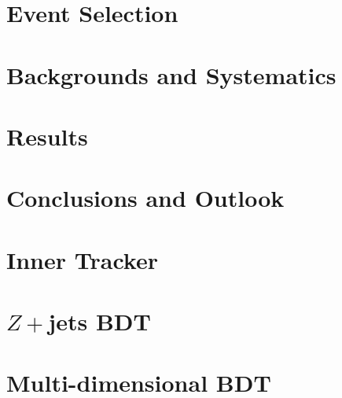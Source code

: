 \documentclass{brandeis-dissertation}
\begin{document}
\chapter{Event Selection}
\label{sec:EventSelection}

\clearpage
\chapter{Backgrounds and Systematics}
\label{sec:BackgroundsSys}

\clearpage
\chapter{Results}
\label{sec:Results}

\clearpage
%

\clearpage
\chapter{Conclusions and Outlook}
\label{sec:conclusion}


\clearpage



\clearpage
\appendix
\chapter{Inner Tracker}
\label{sec:ITk}

\chapter{$Z+$jets BDT}
\label{sec:ZjetsBDT}

\chapter{Multi-dimensional BDT}
\label{sec:3DBDT}

\clearpage
\end{document}
